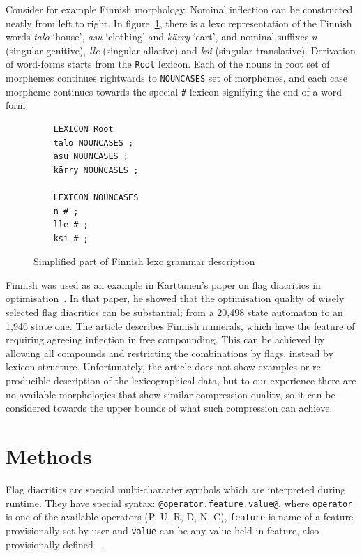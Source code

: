 \documentclass[11pt]{article}
\begin{document}
Consider for example Finnish morphology. Nominal inflection can be
constructed neatly from left to right. In figure~\ref{fig:lexc-fin},
there is a lexc representation of the Finnish words \emph{talo} `house',
\emph{asu} `clothing' and \emph{kärry} `cart', and nominal suffixes
\emph{n} (singular genitive), \emph{lle} (singular allative) and
\emph{ksi} (singular translative). Derivation of word-forms starts
from the \texttt{Root} lexicon. Each of the nouns in root set of morphemes
continues rightwards to \texttt{NOUNCASES} set of morphemes, and each
case morpheme continues towards the special \texttt{\#} lexicon
signifying the end of a word-form.




\begin{figure}
    \centering
    \begin{verbatim}
    LEXICON Root
    talo NOUNCASES ;
    asu NOUNCASES ;
    kärry NOUNCASES ;

    LEXICON NOUNCASES
    n # ;
    lle # ;
    ksi # ;
    \end{verbatim}
    \caption{Simplified part of Finnish lexc grammar description
    \label{fig:lexc-fin}}
\end{figure}

Finnish was used as an example in Karttunen's paper on flag diacritics
in optimisation~. In that paper, he
showed that the optimisation quality of wisely selected flag
diacritics can be substantial; from a 20,498 state automaton to an
1,946 state one. The article describes Finnish numerals, which have
the feature of requiring agreeing inflection in free compounding. This
can be achieved by allowing all compounds and restricting the
combinations by flags, instead by lexicon structure. Unfortunately,
the article does not show examples or re-producible description of the
lexicographical data, but to our experience there are no available
morphologies that show similar compression quality, so it can be
considered towards the upper bounds of what such compression can
achieve.
 

\section{Methods}
\label{sec:methods}

Flag diacritics are special multi-character symbols which are interpreted during runtime. They have special syntax: \verb+@operator.feature.value@+, where
\texttt{operator} is one of the available operators (P, U, R, D, N, C), \texttt{feature} is name of a feature provisionally set by user and \texttt{value} can be any value held in feature, also provisionally defined ~\cite{beesley2003finite}.
\end{document}
